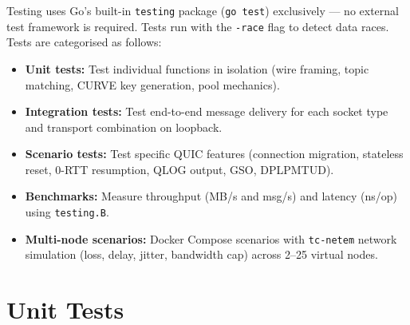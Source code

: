 \documentclass[12pt, a4paper, oneside]{report}
\begin{document}
Testing uses Go's built-in \texttt{testing} package (\texttt{go test}) exclusively — no external test framework is required. Tests run with the \texttt{-race} flag to detect data races. Tests are categorised as follows:

\begin{itemize}
  \item \textbf{Unit tests:} Test individual functions in isolation (wire framing, topic matching, CURVE key generation, pool mechanics).
  \item \textbf{Integration tests:} Test end-to-end message delivery for each socket type and transport combination on loopback.
  \item \textbf{Scenario tests:} Test specific QUIC features (connection migration, stateless reset, 0-RTT resumption, QLOG output, GSO, DPLPMTUD).
  \item \textbf{Benchmarks:} Measure throughput (MB/s and msg/s) and latency (ns/op) using \texttt{testing.B}.
  \item \textbf{Multi-node scenarios:} Docker Compose scenarios with \texttt{tc-netem} network simulation (loss, delay, jitter, bandwidth cap) across 2–25 virtual nodes.
\end{itemize}

\section{Unit Tests}
\label{sec:unit-tests}
\end{document}
